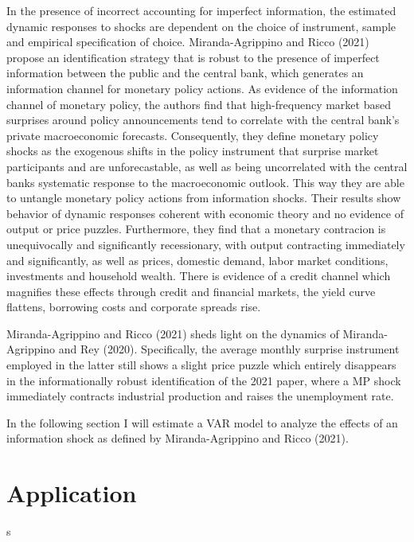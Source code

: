 \documentclass[11pt,a4paper,draft]{article}
\begin{document}
In the presence of incorrect accounting for imperfect information, the estimated dynamic responses to shocks are dependent on the choice of instrument, sample and empirical specification of choice. Miranda-Agrippino and Ricco (2021) propose an identification strategy that is robust to the presence of imperfect information between the public and the central bank, which generates an information channel for monetary policy actions. 
As evidence of the information channel of monetary policy, the authors find that high-frequency market based surprises around policy announcements tend to correlate with the central bank's private macroeconomic forecasts. Consequently, they define monetary policy shocks as the exogenous shifts in the policy instrument that surprise market participants and are unforecastable, as well as being uncorrelated with the central banks systematic response to the macroeconomic outlook.  This way they are able to untangle monetary policy actions from information shocks. 
Their results show behavior of dynamic responses coherent with economic theory and no evidence of output or price puzzles. Furthermore, they find that a monetary contracion is unequivocally and significantly recessionary, with output contracting immediately and significantly, as well as prices, domestic demand, labor market conditions, investments and household wealth. There is evidence of a credit channel which magnifies these effects through credit and financial markets, the yield curve flattens, borrowing costs and corporate spreads rise.





Miranda-Agrippino and Ricco (2021) sheds light on the dynamics of Miranda-Agrippino and Rey (2020). Specifically, the average monthly surprise instrument employed in the latter still shows a slight price puzzle which entirely disappears in the informationally robust identification of the 2021 paper, where a MP shock immediately contracts industrial production and raises the unemployment rate.



In the following section I will estimate a VAR model to analyze the effects of an information shock as defined by Miranda-Agrippino and Ricco (2021).

\section{Application}
s
\end{document}
